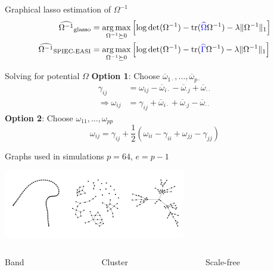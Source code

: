 \documentclass[professionalfonts]{beamer}
\DeclareMathOperator*{\argmax}{arg\,max}
\DeclareMathOperator{\tr}{tr}
\begin{document}
\begin{frame}{Graphical lasso estimation of $\Omega^{-1}$}
\begin{align*}
\widehat{\Omega^{-1}}_{\text{glasso}} &= \argmax_{\Omega^{-1} \succeq 0} \left[ \log \det(\Omega^{-1}) - \tr({\color{blue} \widehat{\Omega}} \Omega^{-1}) - \lambda \lVert \Omega^{-1} \rVert_1 \right] \\
\widehat{\Omega^{-1}}_{\text{SPIEC-EASI}} &= \argmax_{\Omega^{-1} \succeq 0} \left[ \log \det(\Omega^{-1}) - \tr({\color{blue} \widehat{\Gamma}} \Omega^{-1}) - \lambda \lVert \Omega^{-1} \rVert_1 \right]
\end{align*}
\end{frame}

\begin{frame}{Solving for potential $\Omega$}
\textbf{Option 1}: Choose $\overline{\omega}_{1\cdot}, \dots, \overline{\omega}_{p\cdot}$
\begin{align*}
\gamma_{ij} &= \omega_{ij} - \overline{\omega}_{i \cdot} - \overline{\omega}_{\cdot j} + \overline{\omega}_{\cdot \cdot} \\
\Rightarrow \omega_{ij} &= \gamma_{ij} + \overline{\omega}_{i \cdot} + \overline{\omega}_{\cdot j} - \overline{\omega}_{\cdot \cdot}
\end{align*}
\textbf{Option 2}: Choose $\omega_{11}, \dots, \omega_{pp}$
\begin{equation*}
\omega_{ij} = \gamma_{ij} + \frac{1}{2}\left( \omega_{ii} - \gamma_{ii} + \omega_{jj} - \gamma_{jj}\right)
\end{equation*}
\end{frame}

\begin{frame}{Graphs used in simulations}
$p = 64$, $e = p - 1$
\begin{center}
\includegraphics[width=300px]{figs/graphs-64.pdf}
\end{center}
\begin{columns}
\begin{column}{0.3\textwidth}
\centering Band
\end{column}
\begin{column}{0.3\textwidth}
\centering Cluster
\end{column}
\begin{column}{0.3\textwidth}
\centering Scale-free
\end{column}
\end{columns}
\end{frame}
\end{document}
